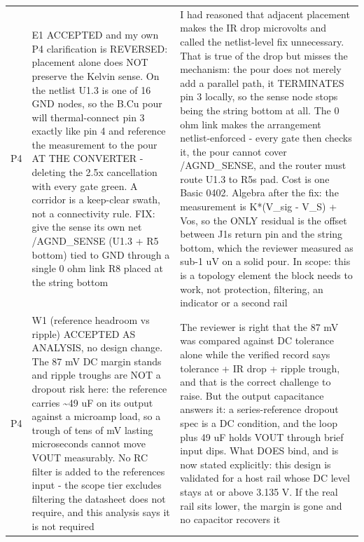 \documentclass[11pt,a4paper]{article}
\begin{document}
{\begin{longtable}{lp{5.2cm}p{7.2cm}}
P4 & E1 ACCEPTED and my own P4 clarification is REVERSED: placement alone does NOT preserve the Kelvin sense. On the netlist U1.3 is one of 16 GND nodes, so the B.Cu pour will thermal-connect pin 3 exactly like pin 4 and reference the measurement to the pour AT THE CONVERTER - deleting the 2.5x cancellation with every gate green. A corridor is a keep-clear swath, not a connectivity rule. FIX: give the sense its own net /AGND\_SENSE (U1.3 + R5 bottom) tied to GND through a single 0 ohm link R8 placed at the string bottom & I had reasoned that adjacent placement makes the IR drop microvolts and called the netlist-level fix unnecessary. That is true of the drop but misses the mechanism: the pour does not merely add a parallel path, it TERMINATES pin 3 locally, so the sense node stops being the string bottom at all. The 0 ohm link makes the arrangement netlist-enforced - every gate then checks it, the pour cannot cover /AGND\_SENSE, and the router must route U1.3 to R5s pad. Cost is one Basic 0402. Algebra after the fix: the measurement is K{*}(V\_sig - V\_S) + Vos, so the ONLY residual is the offset between J1s return pin and the string bottom, which the reviewer measured as sub-1 uV on a solid pour. In scope: this is a topology element the block needs to work, not protection, filtering, an indicator or a second rail \\
P4 & W1 (reference headroom vs ripple) ACCEPTED AS ANALYSIS, no design change. The 87 mV DC margin stands and ripple troughs are NOT a dropout risk here: the reference carries \textasciitilde{}49 uF on its output against a microamp load, so a trough of tens of mV lasting microseconds cannot move VOUT measurably. No RC filter is added to the references input - the scope tier excludes filtering the datasheet does not require, and this analysis says it is not required & The reviewer is right that the 87 mV was compared against DC tolerance alone while the verified record says tolerance + IR drop + ripple trough, and that is the correct challenge to raise. But the output capacitance answers it: a series-reference dropout spec is a DC condition, and the loop plus 49 uF holds VOUT through brief input dips. What DOES bind, and is now stated explicitly: this design is validated for a host rail whose DC level stays at or above 3.135 V. If the real rail sits lower, the margin is gone and no capacitor recovers it \\

\end{longtable}}
\end{document}
